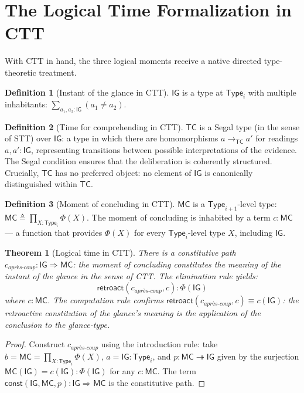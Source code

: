 \documentclass[12pt]{article}
\newtheorem{theorem}{Theorem}
\theoremstyle{definition}
\newtheorem{definition}{Definition}
\theoremstyle{remark}
\newcommand{\Type}[1]{\mathsf{Type}_{#1}}
\newcommand{\aprescoup}{\textit{apr\`{e}s-coup}}
\newcommand{\consthom}[3]{#2 \Rightarrow_{#1} #3}
\newcommand{\MC}{\mathsf{MC}}
\newcommand{\TC}{\mathsf{TC}}
\newcommand{\IG}{\mathsf{IG}}
\begin{document}
\section{The Logical Time Formalization in CTT}

With CTT in hand, the three logical moments receive a native directed type-theoretic treatment.

\begin{definition}[Instant of the glance in CTT]
$\IG$ is a type at $\Type{i}$ with multiple inhabitants: $\sum_{a_1, a_2 : \IG} (a_1 \neq a_2)$.
\end{definition}

\begin{definition}[Time for comprehending in CTT]
$\TC$ is a Segal type (in the sense of STT) over $\IG$: a type in which there are homomorphisms $a \to_\TC a'$ for readings $a, a' : \IG$, representing transitions between possible interpretations of the evidence. The Segal condition ensures that the deliberation is coherently structured. Crucially, $\TC$ has no preferred object: no element of $\IG$ is canonically distinguished within $\TC$.
\end{definition}

\begin{definition}[Moment of concluding in CTT]
$\MC$ is a $\Type{i+1}$-level type: $\MC \triangleq \prod_{X:\Type{i}} \Phi(X)$. The moment of concluding is inhabited by a term $c : \MC$ --- a function that provides $\Phi(X)$ for every $\Type{i}$-level type $X$, including $\IG$.
\end{definition}

\begin{theorem}[Logical time in CTT]
There is a constitutive path $c_{\aprescoup} : \consthom{}{\IG}{\MC}$: the moment of concluding constitutes the meaning of the instant of the glance in the sense of CTT. The elimination rule yields:
\[
\mathsf{retroact}(c_{\aprescoup}, c) : \Phi(\IG)
\]
where $c : \MC$. The computation rule confirms $\mathsf{retroact}(c_{\aprescoup}, c) \equiv c(\IG)$: the retroactive constitution of the glance's meaning is the application of the conclusion to the glance-type.
\end{theorem}

\begin{proof}
Construct $c_{\aprescoup}$ using the introduction rule: take $b = \MC = \prod_{X:\Type{i}} \Phi(X)$, $a = \IG : \Type{i}$, and $p : \MC \twoheadrightarrow \IG$ given by the surjection $\MC(\IG) = c(\IG) : \Phi(\IG)$ for any $c : \MC$. The term $\mathsf{const}(\IG, \MC, p) : \consthom{}{\IG}{\MC}$ is the constitutive path.
\end{proof}
\end{document}
